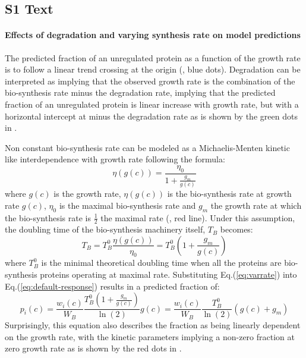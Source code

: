 \documentclass[10pt,letterpaper]{article}
\begin{document}
\subsection*{S1 Text}
\label{theoreticalintercep}
\paragraph{Effects of degradation and varying synthesis rate on model predictions}
The predicted fraction of an unregulated protein as a function of the growth rate is to follow a linear trend crossing at the origin (, blue dots).
Degradation can be interpreted as implying that the observed growth rate is the combination of the bio-synthesis rate minus the degradation rate, implying that the predicted fraction of an unregulated protein is linear increase with growth rate, but with a horizontal intercept at minus the degradation rate as is shown by the green dots in .

Non constant bio-synthesis rate can be modeled as a Michaelis-Menten kinetic like interdependence with growth rate following the formula:
\begin{equation}
\eta(g(c))=\frac{\eta_0}{1+\frac{g_m}{g(c)}}
\end{equation}
where $g(c)$ is the growth rate, $\eta(g(c))$ is the bio-synthesis rate at growth rate $g(c)$, $\eta_0$ is the maximal bio-synthesis rate and $g_m$ the growth rate at which the bio-synthesis rate is $\frac{1}{2}$ the maximal rate (, red line).
Under this assumption, the doubling time of the bio-synthesis machinery itself, $T_B$ becomes:
\begin{equation}
\label{eq:varrate}
T_B=T_B^0\frac{\eta(g(c))}{\eta_0}=T_B^0(1+\frac{g_m}{g(c)})
\end{equation}
where $T_B^0$ is the minimal theoretical doubling time when all the proteins are bio-synthesis proteins operating at maximal rate.
Substituting Eq.(\ref{eq:varrate}) into Eq.(\ref{eq:default-response}) results in a predicted fraction of:
\begin{equation}
p_i(c)=\frac{w_i(c)}{W_B}\frac{T_B^0(1+\frac{g_m}{g(c)})}{\ln(2)}g(c) = \frac{w_i(c)}{W_B}\frac{T_B^0}{\ln(2)}(g(c)+g_m)
\end{equation}
Surprisingly, this equation also describes the fraction as being linearly dependent on the growth rate, with the kinetic parameters implying a non-zero fraction at zero growth rate as is shown by the red dots in .
\end{document}
